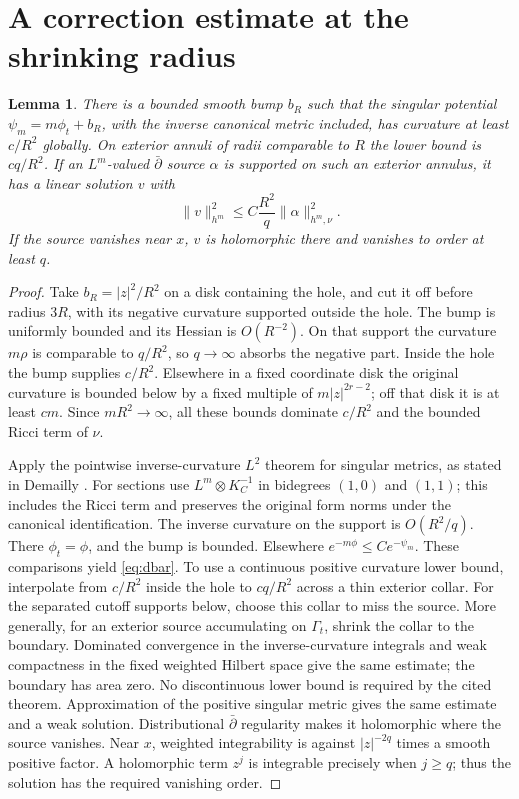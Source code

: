 \documentclass[11pt]{article}
\newtheorem{lemma}[theorem]{Lemma}
\theoremstyle{remark}\newtheorem{remark}[theorem]{Remark}
\begin{document}
\section{A correction estimate at the shrinking radius}
\begin{lemma}\label{lem:dbar}
There is a bounded smooth bump $b_R$ such that the singular potential
$\psi_m=m\phi_t+b_R$, with the inverse canonical metric included,
has curvature at least $c/R^2$ globally. On exterior annuli of radii
comparable to $R$ the lower bound is $cq/R^2$. If an $L^m$-valued
$\bar\partial$ source $\alpha$ is supported on such an exterior annulus,
it has a linear solution $v$ with
\begin{equation}\label{eq:dbar}
 \|v\|_{h^m}^2\leq C\frac{R^2}{q}\|\alpha\|_{h^m,\nu}^2.
\end{equation}
If the source vanishes near $x$, $v$ is holomorphic there and vanishes
to order at least $q$.
\end{lemma}
\begin{proof}
Take $b_R=|z|^2/R^2$ on a disk containing the hole, and cut it off before
radius $3R$, with its negative curvature supported outside the hole.
The bump is uniformly bounded and its Hessian is $O(R^{-2})$. On that
support the curvature $m\rho$ is comparable to $q/R^2$, so $q\to\infty$
absorbs the negative part. Inside the hole the bump supplies $c/R^2$.
Elsewhere in a fixed coordinate disk the original curvature is bounded
below by a fixed multiple of $m|z|^{2r-2}$; off that disk it is at least
$cm$. Since $mR^2\to\infty$, all these bounds dominate $c/R^2$ and the
bounded Ricci term of $\nu$.

Apply the pointwise inverse-curvature $L^2$ theorem for singular metrics,
as stated in Demailly \cite[Theorem~(5.2) and its following paragraph]{D}.
For sections use $L^m\otimes K_C^{-1}$ in bidegrees $(1,0)$ and $(1,1)$;
this includes the Ricci term and preserves the original form norms under
the canonical identification. The inverse curvature on the support is
$O(R^2/q)$. There $\phi_t=\phi$, and the bump is bounded. Elsewhere
$e^{-m\phi}\leq C e^{-\psi_m}$. These comparisons yield \eqref{eq:dbar}.
To use a continuous positive curvature lower bound, interpolate from
$c/R^2$ inside the hole to $cq/R^2$ across a thin exterior collar.
For the separated cutoff supports below, choose this collar to miss
the source. More generally, for an exterior source accumulating on
$\Gamma_t$, shrink the collar to the boundary. Dominated convergence
in the inverse-curvature integrals and weak compactness in the fixed
weighted Hilbert space give the same estimate; the boundary has area
zero. No discontinuous lower bound is required by the cited theorem.
Approximation of the positive singular metric gives the same estimate
and a weak solution. Distributional $\bar\partial$ regularity
\cite[Corollary 13.12]{W} makes it holomorphic where the source vanishes.
Near $x$, weighted integrability is against
$|z|^{-2q}$ times a smooth positive factor. A holomorphic term $z^j$ is
integrable precisely when $j\geq q$; thus the solution has the required
vanishing order.
\end{proof}
\end{document}
